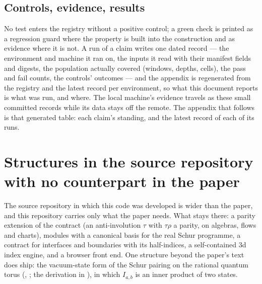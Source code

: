 \documentclass[11pt]{amsart}
\theoremstyle{remark}
\begin{document}
\subsection{Controls, evidence, results}
No test enters the registry without a positive control; a green check is
printed as a regression guard where the property is built into the
construction and as evidence where it is not.  A run of a claim writes one
dated record --- the environment and machine it ran on, the inputs it read
with their manifest fields and digests, the population actually covered
(windows, depths, cells), the pass and fail counts, the controls' outcomes ---
and the appendix is regenerated from the registry and the latest record per
environment, so what this document reports is what was run, and where.  The
local machine's evidence travels as these small committed records while its
data stays off the remote.  The appendix that follows is
that generated table: each claim's standing, and the latest record of each
of its runs.


\section{Structures in the source repository with no counterpart in the paper}\label{sec:beyond}
The source repository in which this code was developed is wider than the
paper, and this repository carries only what the paper needs.  What stays
there: a parity extension of the contract (an anti-involution $\tau$ with
$\tau\rho$ a parity, on algebras, flows and charts), modules with a
canonical basis for the real Schur programme, a contract for interfaces and
boundaries with its half-indices, a self-contained 3d index engine, and a
browser front end.  One structure beyond the paper's text does ship: the
vacuum-state form of the Schur pairing on the rational quantum torus
(, ; the derivation in
), in which $I_{a,b}$ is an inner product
of two states.
\end{document}
